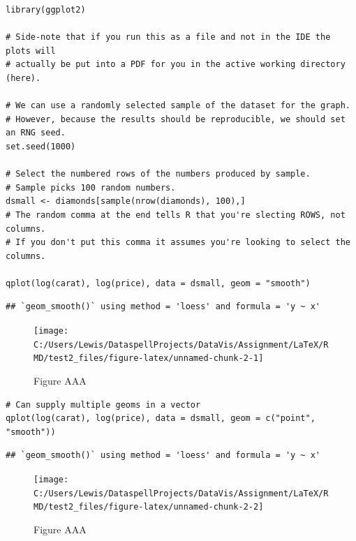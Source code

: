 \begin{verbatim}
library(ggplot2)

# Side-note that if you run this as a file and not in the IDE the plots will
# actually be put into a PDF for you in the active working directory (here).

# We can use a randomly selected sample of the dataset for the graph.
# However, because the results should be reproducible, we should set an RNG seed.
set.seed(1000)

# Select the numbered rows of the numbers produced by sample.
# Sample picks 100 random numbers.
dsmall <- diamonds[sample(nrow(diamonds), 100),]
# The random comma at the end tells R that you're slecting ROWS, not columns.
# If you don't put this comma it assumes you're looking to select the columns.

qplot(log(carat), log(price), data = dsmall, geom = "smooth")
\end{verbatim}

\begin{verbatim}
## `geom_smooth()` using method = 'loess' and formula = 'y ~ x'
\end{verbatim}

\begin{figure}[H]

{\centering \texttt{[image: C:/Users/Lewis/DataspellProjects/DataVis/Assignment/LaTeX/RMD/test2\_files/figure-latex/unnamed-chunk-2-1]} 

}

\caption{Figure AAA}\label{fig:unnamed-chunk-2-1}
\end{figure}

\begin{verbatim}
# Can supply multiple geoms in a vector
qplot(log(carat), log(price), data = dsmall, geom = c("point", "smooth"))
\end{verbatim}

\begin{verbatim}
## `geom_smooth()` using method = 'loess' and formula = 'y ~ x'
\end{verbatim}

\begin{figure}[H]

{\centering \texttt{[image: C:/Users/Lewis/DataspellProjects/DataVis/Assignment/LaTeX/RMD/test2\_files/figure-latex/unnamed-chunk-2-2]} 

}

\caption{Figure AAA}\label{fig:unnamed-chunk-2-2}
\end{figure}

